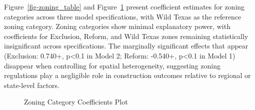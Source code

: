 \documentclass[
  12pt]{article}
\begin{document}
Figure~\ref{fig-zoning_table} and Figure~\ref{fig-zonign_categories}
present coefficient estimates for zoning categories across three model
specifications, with Wild Texas as the reference zoning category. Zoning
categories show minimal explanatory power, with coefficients for
Exclusion, Reform, and Wild Texas zones remaining statistically
insignificant across specifications. The marginally significant effects
that appear (Exclusion: 0.740+, p\textless0.1 in Model 2; Reform:
-0.540+, p\textless0.1 in Model 1) disappear when controlling for
spatial heterogeneity, suggesting zoning regulations play a negligible
role in construction outcomes relative to regional or state-level
factors.

\begin{figure}


\caption{\label{fig-zonign_categories}Zoning Category Coefficients Plot}

\end{figure}%
\end{document}
